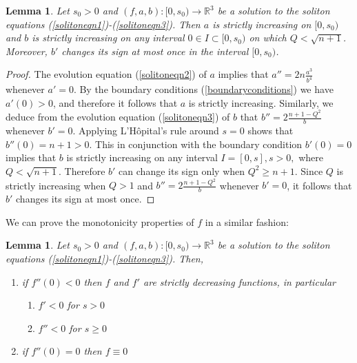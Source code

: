 \documentclass{amsart}
\newtheorem{lem}[thm]{Lemma}
\theoremstyle{definition}
\theoremstyle{remark}
\numberwithin{equation}{section}
\newcommand{\R}{\mathbb{R}}  %
\begin{document}
\begin{lem}
\label{ab_mono}
Let $s_0 >0$ and $(f,a,b): [0,s_0) \rightarrow \R^3$ be a solution to the soliton equations (\ref{solitoneqn1})-(\ref{solitoneqn3}). Then $a$ is strictly increasing on $[0,s_0)$ and $b$ is strictly increasing on any interval $0 \in I \subset [0,s_0)$ on which $Q<\sqrt{n+1}$. Moreover, $b'$ changes its sign at most once in the interval $[0,s_0)$.
\end{lem}
\begin{proof}
The evolution equation (\ref{solitoneqn2}) of $a$ implies that $a'' = 2n \frac{a^3}{b^4}$ whenever $a' = 0$. By the boundary conditions (\ref{boundaryconditions}) we have $a'(0) > 0$, and therefore it follows that $a$ is strictly increasing. Similarly, we deduce from the evolution equation (\ref{solitoneqn3}) of $b$ that $b'' = 2\frac{n+1 - Q^2}{b}$ whenever $b'=0$. Applying L'H\^opital's rule around $s=0$ shows that $b''(0) = n+1>0$. This in conjunction with the boundary condition $b'(0)=0$ implies that $b$ is strictly increasing on any interval $I = [0,s], s>0,$ where $Q < \sqrt{n+1}$. Therefore $b'$ can change its sign only when $Q^2\geq n+1$. Since $Q$ is strictly increasing when $Q>1$ and $b'' = 2\frac{n+1 - Q^2}{b}$ whenever $b'=0$, it follows that $b'$ changes its sign at most once.
\end{proof}
We can prove the monotonicity properties of $f$ in a similar fashion:
\begin{lem}
\label{f_mono}
Let $s_0>0$ and $(f,a,b): [0,s_0) \rightarrow \R^3$ be a solution to the soliton equations (\ref{solitoneqn1})-(\ref{solitoneqn3}). Then,
\begin{enumerate}
\item if $f''(0)<0$ then $f$ and $f'$ are strictly decreasing functions, in particular
	\begin{enumerate}
	\item $f' < 0$ for $s >0$
	\item $f'' < 0$ for $s \geq 0$
	\end{enumerate}
\item if $f''(0) = 0$ then $f\equiv0$
\end{enumerate}
\end{lem}
\end{document}

